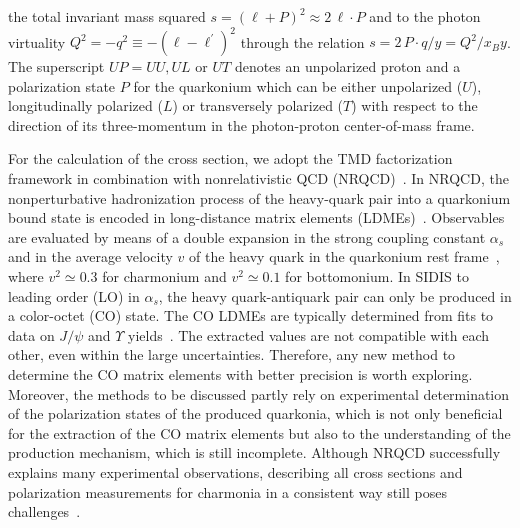\documentclass[prd,aps,preprintnumbers,nofootinbib,superscriptaddress]{revtex4}
\newcommand{\xB}{x_{\scriptscriptstyle B}}
\begin{document}
the total invariant mass squared $s =  (\ell + P)^2 \approx 2\,\ell\cdot P$ and to the photon virtuality $Q^2 = -q^2 \equiv -(\ell-\ell^\prime)^2$ through the relation 
$s = 2\,P\cdot q/y = Q^2/\xB y$.
The superscript $UP=UU, UL $ or $UT$ denotes an unpolarized proton and a polarization state $P$ for the quarkonium which can be either unpolarized ($U$), longitudinally polarized ($L$) or transversely polarized  ($T$) with respect to the direction of its three-momentum in the photon-proton center-of-mass frame.

For the calculation of the cross section, we adopt the TMD factorization framework in combination with nonrelativistic QCD (NRQCD)~\cite{Hagler:2000dd,Yuan:2000qe,Yuan:2008vn}. In NRQCD, the nonperturbative hadronization process of the heavy-quark pair into a quarkonium bound state is encoded in long-distance matrix elements (LDMEs)~\cite{Bodwin:1994jh}. Observables are evaluated by means of a double expansion in the strong coupling constant $\alpha_s$ and in the average velocity $v$ of the heavy quark in the quarkonium rest frame~\cite{Lepage:1992tx}, where $v^2 \simeq 0.3$ for charmonium and $v^2 \simeq 0.1$ for bottomonium. In SIDIS to leading order (LO) in  $\alpha_s$, the heavy quark-antiquark pair can only be produced in a color-octet (CO) state. The CO LDMEs are typically determined from fits to data on $J/\psi$ and $\Upsilon$ yields~\cite{Butenschoen:2010rq,Chao:2012iv,Sharma:2012dy,Bodwin:2014gia,Zhang:2014ybe}. The extracted values are not compatible with each other, even within the large uncertainties. Therefore, any new method to determine the CO matrix elements with better precision is worth exploring. Moreover, the methods to be discussed partly rely on experimental determination of the polarization states of the produced quarkonia, which is not only beneficial for the extraction of the CO matrix elements but also to the understanding of the production mechanism, which is still incomplete. Although NRQCD successfully explains many experimental observations, describing all cross sections and polarization measurements for charmonia in a consistent way still poses challenges~\cite{Brambilla:2010cs,Andronic:2015wma,Lansberg:2019adr}.
\end{document}
